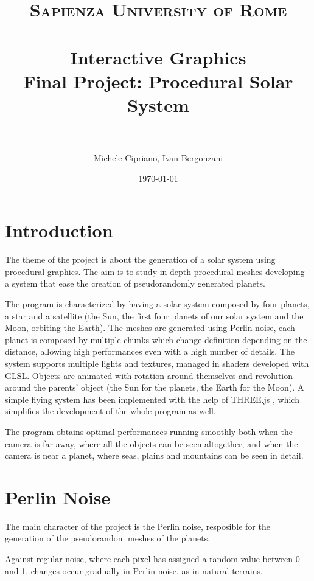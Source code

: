 \documentclass[paper=a4, fontsize=11pt]{scrartcl} %
\title{	
\normalfont \normalsize 
\textsc{Sapienza University of Rome} \\ [25pt] %
\horrule{0.5pt} \\[0.4cm] %
\huge Interactive Graphics \\ %
\large Final Project: Procedural Solar System \\
\horrule{2pt} \\[0.5cm] %
}
\author{Michele Cipriano, Ivan Bergonzani} %
\date{\normalsize\today} %
\numberwithin{equation}{section} %
\numberwithin{figure}{section} %
\numberwithin{table}{section} %
\theoremstyle{definition}
\begin{document}
\maketitle %


\section{Introduction}

The theme of the project is about the generation of a solar system using
procedural graphics. The aim is to study in depth procedural meshes developing
a system that ease the creation of pseudorandomly generated planets.

The program is characterized by having a solar system composed by four planets,
a star and a satellite (the Sun, the first four planets of our solar system and the
Moon, orbiting the Earth). The meshes are generated using Perlin noise, each
planet is composed by multiple chunks which change definition depending on
the distance, allowing high performances even with a high number of details.
The system supports multiple lights and textures, managed in shaders developed
with GLSL. Objects are animated with rotation around themselves and
revolution around the parents' object (the Sun for the planets, the Earth for
the Moon). A simple flying system has been implemented with the help of
THREE.js \cite{threejs}, which simplifies the development of the whole program as well.

The program obtains optimal performances running smoothly both when the
camera is far away, where all the objects can be seen altogether, and when the camera
is near a planet, where seas, plains and mountains can be seen in detail.


\section{Perlin Noise}

The main character of the project is the Perlin noise, resposible for the
generation of the pseudorandom meshes of the planets.

Against regular noise, where each pixel has assigned a random value between 0
and 1, changes occur gradually in Perlin noise, as in natural terrains.
\end{document}
